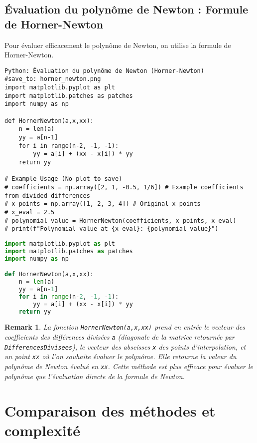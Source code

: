 \documentclass{article}
\newtheorem{remark}{Remark}
\begin{document}
\subsection{Évaluation du polynôme de Newton : Formule de Horner-Newton}

Pour évaluer efficacement le polynôme de Newton, on utilise la formule de Horner-Newton.

\begin{verbatim}
Python: Évaluation du polynôme de Newton (Horner-Newton)
#save_to: horner_newton.png
import matplotlib.pyplot as plt
import matplotlib.patches as patches
import numpy as np

def HornerNewton(a,x,xx):
    n = len(a)
    yy = a[n-1]
    for i in range(n-2, -1, -1):
        yy = a[i] + (xx - x[i]) * yy
    return yy

# Example Usage (No plot to save)
# coefficients = np.array([2, 1, -0.5, 1/6]) # Example coefficients from divided differences
# x_points = np.array([1, 2, 3, 4]) # Original x points
# x_eval = 2.5
# polynomial_value = HornerNewton(coefficients, x_points, x_eval)
# print(f"Polynomial value at {x_eval}: {polynomial_value}")

\end{verbatim}

\begin{lstlisting}[language=Python, caption=Évaluation du polynôme de Newton (Horner-Newton), label=code:horner_newton_python]
import matplotlib.pyplot as plt
import matplotlib.patches as patches
import numpy as np

def HornerNewton(a,x,xx):
    n = len(a)
    yy = a[n-1]
    for i in range(n-2, -1, -1):
        yy = a[i] + (xx - x[i]) * yy
    return yy
\end{lstlisting}

\begin{remark}
La fonction \texttt{HornerNewton(a,x,xx)} prend en entrée le vecteur des coefficients des différences divisées \texttt{a} (diagonale de la matrice retournée par \texttt{DifferencesDivisees}), le vecteur des abscisses \texttt{x} des points d'interpolation, et un point \texttt{xx} où l'on souhaite évaluer le polynôme. Elle retourne la valeur du polynôme de Newton évalué en \texttt{xx}. Cette méthode est plus efficace pour évaluer le polynôme que l'évaluation directe de la formule de Newton.
\end{remark}


\section{Comparaison des méthodes et complexité}
\end{document}
